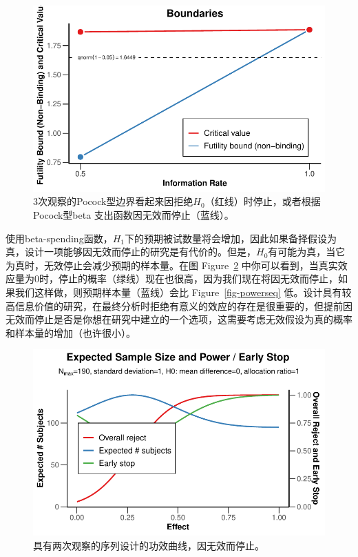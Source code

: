\documentclass[
  letterpaper,
  DIV=11,
  numbers=noendperiod]{scrreprt}
\begin{document}
\begin{figure}[H]

{\centering \includegraphics[width=1\textwidth,height=\textheight]{10-sequential_files/figure-pdf/fig-futility2-1.pdf}

}

\caption{\label{fig-futility2}3次观察的Pocock型边界看起来因拒绝\(H_0\)（红线）时停止，或者根据Pocock型beta
支出函数因无效而停止（蓝线）。}

\end{figure}

使用beta-spending函数，\(H_1\)下的预期被试数量将会增加，因此如果备择假设为真，设计一项能够因无效而停止的研究是有代价的。但是，\(H_0\)有可能为真，当它为真时，无效停止会减少预期的样本量。在图
Figure~\ref{fig-powerseq2}
中你可以看到，当真实效应量为0时，停止的概率（绿线）现在也很高，因为我们现在将因无效而停止，如果我们这样做，则预期样本量（蓝线）会比
Figure~\ref{fig-powerseq}
低。设计具有较高信息价值的研究，在最终分析时拒绝有意义的效应的存在是很重要的，但提前因无效而停止是否是你想在研究中建立的一个选项，这需要考虑无效假设为真的概率和样本量的增加（也许很小）。

\begin{figure}

{\centering \includegraphics[width=1\textwidth,height=\textheight]{10-sequential_files/figure-pdf/fig-powerseq2-1.pdf}

}

\caption{\label{fig-powerseq2}具有两次观察的序列设计的功效曲线，因无效而停止。}

\end{figure}
\end{document}
